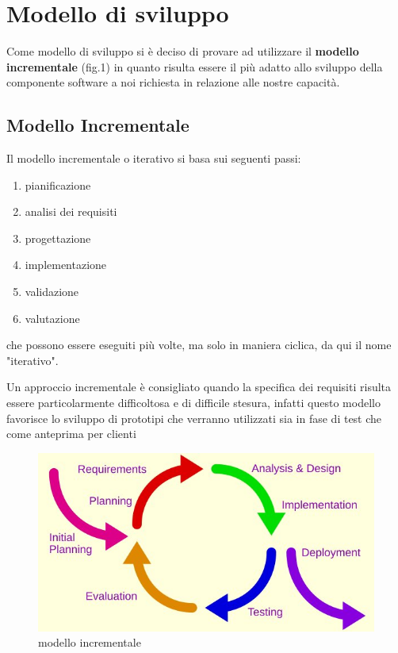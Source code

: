 \section{Modello di sviluppo}
	Come modello di sviluppo si è deciso di provare ad utilizzare il \textbf{modello incrementale} (fig.1) in quanto risulta essere il più adatto allo sviluppo della componente software a noi richiesta in relazione alle nostre capacità. 
	
	\subsection{Modello Incrementale}
		Il modello incrementale o iterativo si basa sui seguenti passi:
		\begin{enumerate}
			\item pianificazione
			\item analisi dei requisiti
			\item progettazione
			\item implementazione
			\item validazione
			\item valutazione
		\end{enumerate}
		che possono essere eseguiti più volte, ma solo in maniera ciclica, da qui il nome "iterativo".
		

		
		Un approccio incrementale è consigliato quando la specifica dei requisiti risulta essere particolarmente difficoltosa e di difficile stesura, infatti questo modello favorisce lo sviluppo di prototipi che verranno utilizzati sia in fase di test che come anteprima per clienti

		\begin{figure}
			\centering
		    \includegraphics{Iterative_development_model.jpg}
			\caption{modello incrementale}\label{fig:1}
		\end{figure}